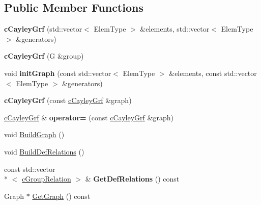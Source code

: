\subsection*{Public Member Functions}
\begin{DoxyCompactItemize}
\item 
\hypertarget{classcCayleyGrf_ac94c0ddf2262aab4ce17454fb10e7286}{{\bfseries c\-Cayley\-Grf} (std\-::vector$<$ Elem\-Type $>$ \&elements, std\-::vector$<$ Elem\-Type $>$ \&generators)}\label{classcCayleyGrf_ac94c0ddf2262aab4ce17454fb10e7286}

\item 
\hypertarget{classcCayleyGrf_a6f1bc787dd952aae0b5e5d4d6d39fe35}{{\bfseries c\-Cayley\-Grf} (G \&group)}\label{classcCayleyGrf_a6f1bc787dd952aae0b5e5d4d6d39fe35}

\item 
\hypertarget{classcCayleyGrf_a0b2e24fa4d3b4424888203b004eaf33d}{void {\bfseries init\-Graph} (const std\-::vector$<$ Elem\-Type $>$ \&elements, const std\-::vector$<$ Elem\-Type $>$ \&generators)}\label{classcCayleyGrf_a0b2e24fa4d3b4424888203b004eaf33d}

\item 
\hypertarget{classcCayleyGrf_ae597aa2fce821346c6f3976e70eb6a75}{{\bfseries c\-Cayley\-Grf} (const \hyperlink{classcCayleyGrf}{c\-Cayley\-Grf} \&graph)}\label{classcCayleyGrf_ae597aa2fce821346c6f3976e70eb6a75}

\item 
\hypertarget{classcCayleyGrf_a31a02f7a0e7702fe953409f7f82888be}{\hyperlink{classcCayleyGrf}{c\-Cayley\-Grf} \& {\bfseries operator=} (const \hyperlink{classcCayleyGrf}{c\-Cayley\-Grf} \&graph)}\label{classcCayleyGrf_a31a02f7a0e7702fe953409f7f82888be}

\item 
void \hyperlink{classcCayleyGrf_a4a0ff02aa7bb9d556456b34e9f66f3d9}{Build\-Graph} ()
\item 
void \hyperlink{classcCayleyGrf_a8517436f6101a294fa7f30355efaa196}{Build\-Def\-Relations} ()
\item 
\hypertarget{classcCayleyGrf_a3e564efb726dd010598404e7aeb7737c}{const std\-::vector\\*
$<$ \hyperlink{classcGroupRelation}{c\-Group\-Relation} $>$ \& {\bfseries Get\-Def\-Relations} () const }\label{classcCayleyGrf_a3e564efb726dd010598404e7aeb7737c}

\item 
Graph $\ast$ \hyperlink{classcCayleyGrf_aeb4d8533b65921ca63fdaaf4516f92f6}{Get\-Graph} () const 
\end{DoxyCompactItemize}
